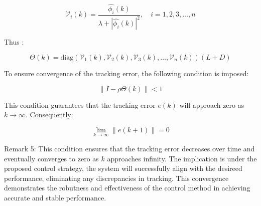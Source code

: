 \documentclass[journal,onecolumn]{IEEEtran}
\begin{document}




\[
\mathcal{V}_i(k) = \frac{\hat{\phi_i}(k)}{\lambda + |\hat{\phi_i}(k)|^2}, \quad i = 1, 2, 3, \dots, n
\]

Thus :

\[
\Theta(k) = \text{diag}(\mathcal{V}_1(k), \mathcal{V}_2(k), \mathcal{V}_3(k), \dots, \mathcal{V}_n(k)) (L + D)
\]

To ensure convergence of the tracking error, the following condition is imposed:

\begin{equation}
    \label{model 31}
    \|I - \rho \Theta(k)\| < 1
\end{equation}

This condition guarantees that the tracking error \(e(k)\) will approach zero as \(k \to \infty\). Consequently:

\[
\lim_{k \to \infty} \|e(k+1)\| = 0
\]


Remark 5: This condition ensures that the tracking error decreases over time and eventually converges to zero as $k$ approaches infinity. The implication is under the proposed control strategy, the system will successfully align with the desireed performance, eliminating any discrepancies in tracking. This convergence demonstrates the robutness and effectiveness of the control method in achieving accurate and stable performance.







\end{document}
